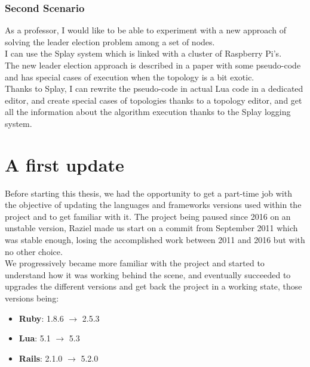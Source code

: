 \documentclass{eplmastersthesis}
\begin{document}
        \subsubsection{Second Scenario}

          As a professor, I would like to be able to experiment with a new
          approach of solving the leader election problem among a set of
          nodes.\\
          I can use the Splay system which is linked with a cluster of
          Raspberry Pi's.\\
          The new leader election approach is described in a paper with some
          pseudo-code and has special cases of execution when the topology is
          a bit exotic.\\
          Thanks to Splay, I can rewrite the pseudo-code in actual Lua code
          in a dedicated editor, and create special cases of topologies
          thanks to a topology editor, and get all the information about
          the algorithm execution thanks to the Splay logging system.

    \section{A first update}

      Before starting this thesis, we had the opportunity to get a part-time
      job with the objective of updating the languages and frameworks versions
      used within the project and to get familiar with it. The project being
      paused since 2016 on an unstable version, Raziel made us start on a
      commit from September 2011 which was stable enough, losing the
      accomplished work between 2011 and 2016 but with no other choice.\\

      We progressively became more familiar with the project and started to
      understand how it was working behind the scene, and eventually succeeded
      to upgrades the different versions and get back the project in a working
      state, those versions being:

      \begin{itemize}
        \item \textbf{Ruby}: 1.8.6 $\rightarrow$ 2.5.3
        \item \textbf{Lua}: 5.1 $\rightarrow$ 5.3
        \item \textbf{Rails}: 2.1.0 $\rightarrow$ 5.2.0
      \end{itemize}
\end{document}

